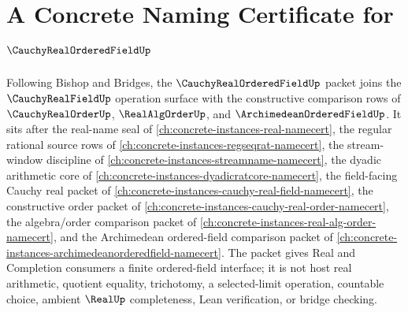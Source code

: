 \chapter{A Concrete Naming Certificate for $\CauchyRealOrderedFieldUp$}
\label{ch:concrete-instances-cauchy-real-ordered-field-namecert}

Following Bishop and Bridges, the $\CauchyRealOrderedFieldUp$ packet joins the $\CauchyRealFieldUp$ operation surface with the constructive comparison rows of $\CauchyRealOrderUp$, $\RealAlgOrderUp$, and $\ArchimedeanOrderedFieldUp$. It sits after the real-name seal of \autoref{ch:concrete-instances-real-namecert}, the regular rational source rows of \autoref{ch:concrete-instances-regseqrat-namecert}, the stream-window discipline of \autoref{ch:concrete-instances-streamname-namecert}, the dyadic arithmetic core of \autoref{ch:concrete-instances-dyadicratcore-namecert}, the field-facing Cauchy real packet of \autoref{ch:concrete-instances-cauchy-real-field-namecert}, the constructive order packet of \autoref{ch:concrete-instances-cauchy-real-order-namecert}, the algebra/order comparison packet of \autoref{ch:concrete-instances-real-alg-order-namecert}, and the Archimedean ordered-field comparison packet of \autoref{ch:concrete-instances-archimedeanorderedfield-namecert}. The packet gives Real and Completion consumers a finite ordered-field interface; it is not host real arithmetic, quotient equality, trichotomy, a selected-limit operation, countable choice, ambient $\RealUp$ completeness, Lean verification, or bridge checking.

